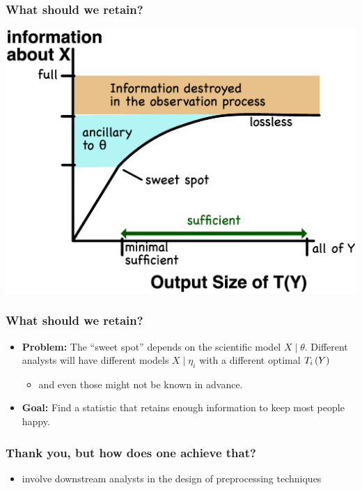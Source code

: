 \documentclass[10pt, compress]{beamer}
\begin{document}
\begin{frame}[fragile]
    \frametitle{What should we retain?}
    \includegraphics[width=\textwidth]{assets/information.eps}
\end{frame}

\begin{frame}[fragile]
    \frametitle{What should we retain?}
    \begin{itemize}
        \item \textbf{Problem:} The “sweet spot” depends on the scientific model $X \mid \theta$. Different analysts will have different models $X \mid \eta_i$ with a different optimal $T_i\del{Y}$
            \begin{itemize}
                \item and even those might not be known in advance.
            \end{itemize}
        \item \textbf{Goal:} Find a statistic that retains enough information to keep most people happy.
    \end{itemize}
\end{frame}

\begin{frame}[fragile]
    \frametitle{Thank you, but how does one achieve that?}
    \begin{itemize}
        \item involve downstream analysts in the design of preprocessing techniques
    \end{itemize}
\end{frame}
\end{document}
